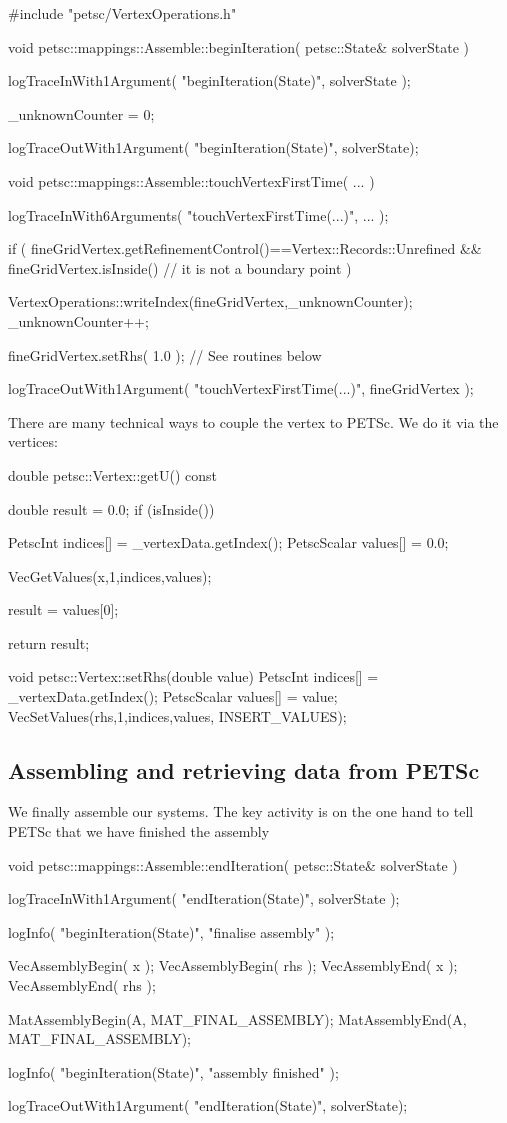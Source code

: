 \begin{code}
#include "petsc/VertexOperations.h"

void petsc::mappings::Assemble::beginIteration(
  petsc::State&  solverState
) {
  logTraceInWith1Argument( "beginIteration(State)", solverState );

  _unknownCounter = 0;

  logTraceOutWith1Argument( "beginIteration(State)", solverState);
}

void petsc::mappings::Assemble::touchVertexFirstTime(
  ...
) {
  logTraceInWith6Arguments( "touchVertexFirstTime(...)", ... );

  if (
    fineGridVertex.getRefinementControl()==Vertex::Records::Unrefined
    &&
    fineGridVertex.isInside() // it is not a boundary point
  ) {
    VertexOperations::writeIndex(fineGridVertex,_unknownCounter);
    _unknownCounter++;
    
    fineGridVertex.setRhs( 1.0 ); // See routines below
  }

  logTraceOutWith1Argument( "touchVertexFirstTime(...)", fineGridVertex );
}
\end{code}

\noindent
There are many technical ways to couple the vertex to PETSc.
We do it via the vertices:

\begin{code}
double petsc::Vertex::getU() const {
  double result = 0.0;
  if (isInside()) {
    PetscInt     indices[] = {_vertexData.getIndex()};
    PetscScalar  values[]  = {0.0};

    VecGetValues(x,1,indices,values);

    result = values[0];
  }
  return result;
}


void petsc::Vertex::setRhs(double value) {
  PetscInt     indices[] = {_vertexData.getIndex()};
  PetscScalar  values[]  = {value};
  VecSetValues(rhs,1,indices,values, INSERT_VALUES);
}
\end{code}



\subsection{Assembling and retrieving data from PETSc}

We finally assemble our systems. The key activity is on the one hand to tell
PETSc that we have finished the assembly

\begin{code}
void petsc::mappings::Assemble::endIteration(
  petsc::State&  solverState
) {
  logTraceInWith1Argument( "endIteration(State)", solverState );

  logInfo( "beginIteration(State)", "finalise assembly" );

  VecAssemblyBegin( x );
  VecAssemblyBegin( rhs );
  VecAssemblyEnd( x );
  VecAssemblyEnd( rhs );

  MatAssemblyBegin(A, MAT_FINAL_ASSEMBLY);
  MatAssemblyEnd(A, MAT_FINAL_ASSEMBLY);

  logInfo( "beginIteration(State)", "assembly finished" );

  logTraceOutWith1Argument( "endIteration(State)", solverState);
}
\end{code}

